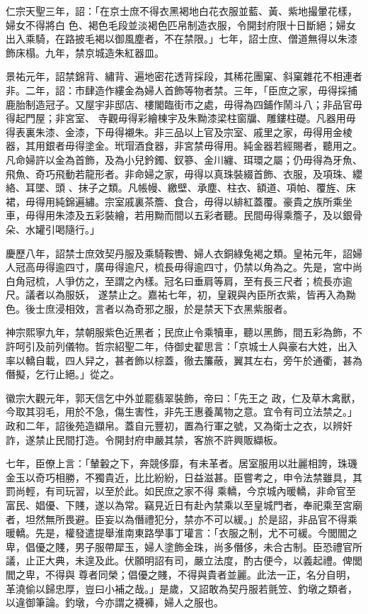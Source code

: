 \begin{pinyinscope}
 仁宗天聖三年，詔：「在京士庶不得衣黑褐地白花衣服並藍、黃、紫地撮暈花樣，婦女不得將白
 色、褐色毛段並淡褐色匹帛制造衣服，令開封府限十日斷絕；婦女出入乘騎，在路披毛褐以御風塵者，不在禁限。」七年，詔士庶、僧道無得以朱漆飾床榻。九年，禁京城造朱紅器皿。


景祐元年，詔禁錦背、繡背、遍地密花透背採段，其稀花團窠、斜窠雜花不相連者非。二年，詔：市肆造作縷金為婦人首飾等物者禁。三年，「臣庶之家，毋得採捕鹿胎制造冠子。又屋宇非邸店、樓閣臨街市之處，毋得為四鋪作鬧斗八；非品官毋得起門屋；非宮室、
 寺觀毋得彩繪棟宇及朱黝漆梁柱窗牖、雕鏤柱礎。凡器用毋得表裏朱漆、金漆，下毋得襯朱。非三品以上官及宗室、戚里之家，毋得用金棱器，其用銀者毋得塗金。玳瑁酒食器，非宮禁毋得用。純金器若經賜者，聽用之。凡命婦許以金為首飾，及為小兒鈐鐲、釵篸、金川纏、珥環之屬；仍毋得為牙魚、飛魚、奇巧飛動若龍形者。非命婦之家，毋得以真珠裝綴首飾、衣服，及項珠、纓絡、耳墜、頭
 、抹子之類。凡帳幔、繳壁、承塵、柱衣、額道、項帕、覆旌、床
 裙，毋得用純錦遍繡。宗室戚裏茶簷、食合，毋得以緋紅蓋覆。豪貴之族所乘坐車，毋得用朱漆及五彩裝繪，若用黝而間以五彩者聽。民間毋得乘簷子，及以銀骨朵、水罐引喝隨行。」



 慶歷八年，詔禁士庶效契丹服及乘騎鞍轡、婦人衣銅綠兔褐之類。皇祐元年，詔婦人冠高毋得逾四寸，廣毋得逾尺，梳長毋得逾四寸，仍禁以角為之。先是，宮中尚白角冠梳，人爭仿之，至謂之內樣。冠名曰垂肩等肩，至有長三尺者；梳長亦逾尺。議者以為服妖，
 遂禁止之。嘉祐七年，初，皇親與內臣所衣紫，皆再入為黝色。後士庶浸相效，言者以為奇邪之服，於是禁天下衣黑紫服者。



 神宗熙寧九年，禁朝服紫色近黑者；民庶止令乘犢車，聽以黑飾，間五彩為飾，不許呵引及前列儀物。哲宗紹聖二年，侍御史翟思言：「京城士人與豪右大姓，出入率以轎自載，四人舁之，甚者飾以棕蓋，徹去簾蔽，翼其左右，旁午於通衢，甚為僭擬，乞行止絕。」從之。



 徽宗大觀元年，郭天信乞中外並罷翡翠裝飾，帝曰：「先王之
 政，仁及草木禽獸，今取其羽毛，用於不急，傷生害性，非先王惠養萬物之意。宜令有司立法禁之。」政和二年，詔後苑造纈帛。蓋自元豐初，置為行軍之號，又為衛士之衣，以辨奸詐，遂禁止民間打造。令開封府申嚴其禁，客旅不許興販纈板。



 七年，臣僚上言：「輦轂之下，奔競侈靡，有未革者。居室服用以壯麗相誇，珠璣金玉以奇巧相勝，不獨貴近，比比紛紛，日益滋甚。臣嘗考之，申令法禁雖具，其罰尚輕，有司玩習，以至於此。如民庶之家不得
 乘轎，今京城內暖轎，非命官至富民、娼優、下賤，遂以為常。竊見近日有赴內禁乘以至皇城門者，奉祀乘至宮廟者，坦然無所畏避。臣妄以為僭禮犯分，禁亦不可以緩。」於是詔，非品官不得乘暖轎。先是，權發遣提舉淮南東路學事丁瓘言：「衣服之制，尤不可緩。今閭閻之卑，倡優之賤，男子服帶犀玉，婦人塗飾金珠，尚多僭侈，未合古制。臣恐禮官所議，止正大典，未遑及此。伏願明詔有司，嚴立法度，酌古便今，以義起禮。俾閭閻之卑，不得與
 尊者同榮；倡優之賤，不得與貴者並麗。此法一正，名分自明，革澆偷以歸忠厚，豈曰小補之哉。」是歲，又詔敢為契丹服若氈笠、釣墩之類者，以違御筆論。釣墩，今亦謂之襪褲，婦人之服也。




\end{pinyinscope}
